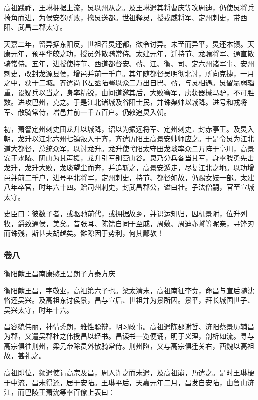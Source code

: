 \documentclass[]{article}
\begin{document}
高祖践祚，王琳拥据上流，炅以州从之。及王琳遣其将曹庆等攻周迪，仍使炅将兵掎角而进，为侯安都所败，擒炅送都。世祖释炅，授戎威将军、定州刺史，带西阳、武昌二郡太守。

天嘉二年，留异据东阳反，世祖召炅还都，欲令讨异。未至而异平，炅还本镇。天康元年，预平华皎之功，授员外散骑常侍。太建元年，迁持节、龙骧将军、通直散骑常侍。五年，进授使持节、西道都督安、蕲、江、衡、司、定六州诸军事、安州刺史，改封龙源县侯，增邑并前一千户。其年随都督吴明彻北讨，所向克捷，一月之中，获十二城。齐遣尚书左丞陆骞以众二万出自巴、蕲，与炅相遇。炅留羸弱辎重，设疑兵以当之，身率精锐，由间道邀其后，大败骞军，虏获器械马驴，不可胜数。进攻巴州，克之。于是江北诸城及谷阳士民，并诛渠帅以城降。进号和戎将军、散骑常侍，增邑并前一千五百户。仍敕追炅入朝。

初，萧詧定州刺史田龙升以城降，诏以为振远将军、定州刺史，封赤亭王。及炅入朝，龙升以江北六州七镇叛入于齐，齐遣历阳王高景安帅师应之。于是令炅为江北道大都督，总统众军，以讨龙升。龙升使弋阳太守田龙琰率众二万阵于亭川，高景安于水陵、阴山为其声援，龙升引军别营山谷。炅乃分兵各当其军，身率骁勇先击龙升，龙升大败，龙琰望尘而奔，并追斩之，高景安遁走，尽复江北之地。以功增邑并前二千户，进号平北将军，定州刺史，持节、都督如故，仍赐女妓一部。太建八年卒官，时年六十四。赠司州刺史，封武昌郡公，谥曰壮。子法僧嗣，官至宣城太守。

史臣曰：彼数子者，或驱驰前代，或拥据故乡，并识运知归，因机景附，位升列牧，爵致通侯，美矣。昔张耳、陈馀自同于至戚，周敷、周迪亦誓等昵亲，寻锋刃而诛残，斯甚夫胡越矣。雠隙因于势利，何其鄙欤！

\hypertarget{header-n4477}{%
\subsubsection{卷八}\label{header-n4477}}

衡阳献王昌南康愍王昙朗子方泰方庆

衡阳献王昌，字敬业，高祖第六子也。梁太清末，高祖南征李贲，命昌与宣后随沈恪还吴兴。及高祖东讨侯景，昌与宣后、世祖并为景所囚。景平，拜长城国世子、吴兴太守，时年十六。

昌容貌伟丽，神情秀朗，雅性聪辩，明习政事。高祖遣陈郡谢哲、济阳蔡景历辅昌为郡，又遣吴郡杜之伟授昌以经书。昌读书一览便诵，明于义理，剖析如流。寻与高宗俱往荆州，梁元帝除员外散骑常侍。荆州陷，又与高宗俱迁关右，西魏以高祖故，甚礼之。

高祖即位，频遣使请高宗及昌，周人许之而未遣，及高祖崩，乃遣之。是时王琳梗于中流，昌未得还，居于安陆。王琳平后，天嘉元年二月，昌发自安陆，由鲁山济江，而巴陵王萧沇等率百僚上表曰：
\end{document}
